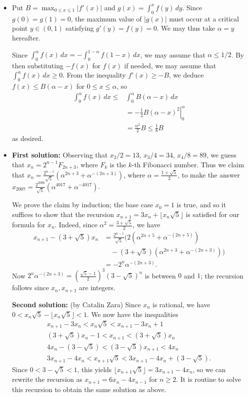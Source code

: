 \documentclass[amssymb,twocolumn,pra,10pt,aps]{revtex4-1}
\begin{document}
\begin{itemize}
\item[B--2]
Put $B = \max_{0 \leq x \leq 1} |f'(x)|$
and $g(x) = \int_0^x f(y)\,dy$. Since $g(0) = g(1) = 0$, the maximum value
of $|g(x)|$ must occur at a critical point $y \in (0,1)$ satisfying
$g'(y) = f(y) = 0$. We may thus take $\alpha = y$ hereafter.

Since $\int_0^\alpha f(x)\,dx = -\int_0^{1-\alpha} f(1-x)\,dx$,
we may assume that $\alpha \leq 1/2$. By then substituting $-f(x)$
for $f(x)$ if needed, we may assume that $\int_0^\alpha f(x)\,dx \geq 0$.
{}From the inequality $f'(x) \geq -B$, we deduce
$f(x) \leq B(\alpha - x)$ for $0 \leq x \leq \alpha$, so
\begin{align*}
\int_0^\alpha f(x)\,dx \leq &\int_0^\alpha B(\alpha-x)\,dx \\
&= -\left. \frac{1}{2} B (\alpha - x)^2 \right|_0^\alpha \\
&= \frac{\alpha^2}{2} B \leq \frac{1}{8} B
\end{align*}
as desired.

\item[B--3]
\textbf{First solution:}
Observing that $x_2/2 = 13$, $x_3/4=34$, $x_4/8=89$, we
guess that $x_n = 2^{n-1} F_{2n+3}$, where $F_k$ is the $k$-th
Fibonacci number. Thus we claim that $x_n = \frac{2^{n-1}}{\sqrt{5}}
(\alpha^{2n+3}+\alpha^{-(2n+3)})$, where $\alpha =
\frac{1+\sqrt{5}}{2}$, to make the answer $x_{2007} =
\frac{2^{2006}}{\sqrt{5}}(\alpha^{4017}+\alpha^{-4017})$.

We prove the claim by induction; the base case $x_0 = 1$ is true, and
so it suffices to show that the recursion $x_{n+1} = 3x_n + \lfloor
x_n \sqrt{5} \rfloor$ is satisfied for our formula for $x_n$. Indeed,
since $\alpha^2 = \frac{3+\sqrt{5}}{2}$, we have
\begin{align*}
x_{n+1}-(3+\sqrt{5})x_n &= \frac{2^{n-1}}{\sqrt{5}}
(2(\alpha^{2n+5}+\alpha^{-(2n+5)}) \\
&\quad-(3+\sqrt{5})(\alpha^{2n+3}+\alpha^{-(2n+3)})) \\
&= -2^n \alpha^{-(2n+3)}.
\end{align*}
Now $2^n \alpha^{-(2n+3)} =
(\frac{\sqrt{5}-1}{2})^3 (3-\sqrt{5})^n$ is between $0$ and $1$; the
recursion follows since $x_n,x_{n+1}$ are integers.

\textbf{Second solution:}
(by Catalin Zara)
Since $x_n$ is rational, we have $0 < x_n \sqrt{5} - \lfloor x_n \sqrt{5}
\rfloor < 1$. We now have the inequalities
\begin{gather*}
x_{n+1}-3x_n < x_n \sqrt{5} < x_{n+1} -3x_n+1 \\
(3+\sqrt{5})x_n - 1 < x_{n+1} < (3+\sqrt{5})x_n \\
4x_n - (3-\sqrt{5}) < (3-\sqrt{5})x_{n+1} < 4x_n \\
3x_{n+1} - 4x_n < x_{n+1} \sqrt{5} < 3x_{n+1}-4x_n + (3-\sqrt{5}).
\end{gather*}
Since $0 < 3-\sqrt{5} < 1$, this yields $\lfloor x_{n+1} \sqrt{5}
\rfloor = 3x_{n+1} - 4x_n$, so we can rewrite the recursion as
$x_{n+1} = 6x_n - 4x_{n-1}$ for $n \geq 2$. It is routine to solve
this recursion to obtain the same solution as above.


\end{itemize}
\end{document}
